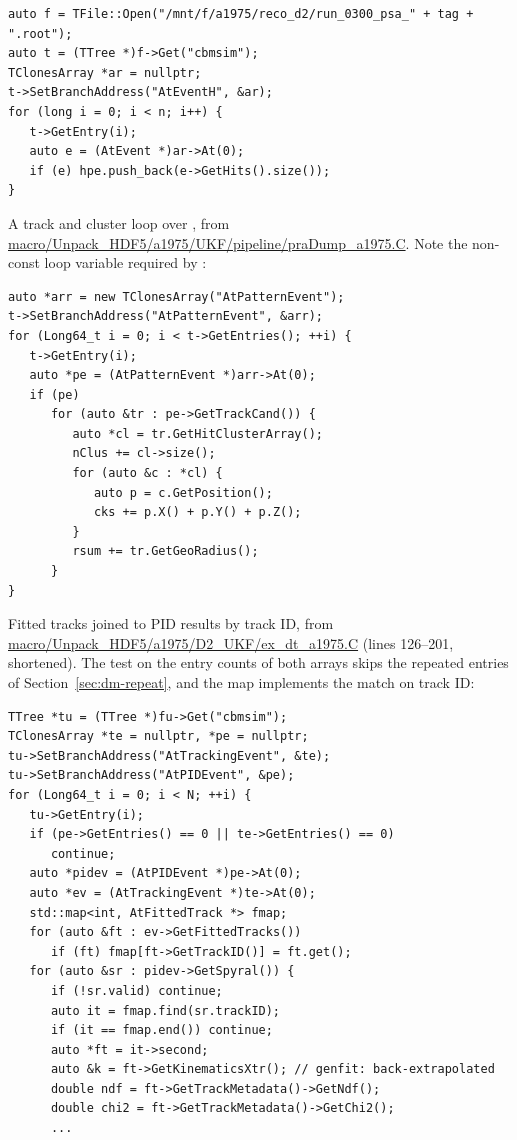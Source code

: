 \begin{verbatim}
auto f = TFile::Open("/mnt/f/a1975/reco_d2/run_0300_psa_" + tag + ".root");
auto t = (TTree *)f->Get("cbmsim");
TClonesArray *ar = nullptr;
t->SetBranchAddress("AtEventH", &ar);
for (long i = 0; i < n; i++) {
   t->GetEntry(i);
   auto e = (AtEvent *)ar->At(0);
   if (e) hpe.push_back(e->GetHits().size());
}
\end{verbatim}

A track and cluster loop over , from
\url{macro/Unpack_HDF5/a1975/UKF/pipeline/praDump_a1975.C}. Note the non-const loop variable required by
:

\begin{verbatim}
auto *arr = new TClonesArray("AtPatternEvent");
t->SetBranchAddress("AtPatternEvent", &arr);
for (Long64_t i = 0; i < t->GetEntries(); ++i) {
   t->GetEntry(i);
   auto *pe = (AtPatternEvent *)arr->At(0);
   if (pe)
      for (auto &tr : pe->GetTrackCand()) {
         auto *cl = tr.GetHitClusterArray();
         nClus += cl->size();
         for (auto &c : *cl) {
            auto p = c.GetPosition();
            cks += p.X() + p.Y() + p.Z();
         }
         rsum += tr.GetGeoRadius();
      }
}
\end{verbatim}

Fitted tracks joined to PID results by track ID, from
\url{macro/Unpack_HDF5/a1975/D2_UKF/ex_dt_a1975.C} (lines 126--201, shortened). The test on the
entry counts of both arrays skips the repeated entries of Section~\ref{sec:dm-repeat}, and the map
implements the match on track ID:

\begin{verbatim}
TTree *tu = (TTree *)fu->Get("cbmsim");
TClonesArray *te = nullptr, *pe = nullptr;
tu->SetBranchAddress("AtTrackingEvent", &te);
tu->SetBranchAddress("AtPIDEvent", &pe);
for (Long64_t i = 0; i < N; ++i) {
   tu->GetEntry(i);
   if (pe->GetEntries() == 0 || te->GetEntries() == 0)
      continue;
   auto *pidev = (AtPIDEvent *)pe->At(0);
   auto *ev = (AtTrackingEvent *)te->At(0);
   std::map<int, AtFittedTrack *> fmap;
   for (auto &ft : ev->GetFittedTracks())
      if (ft) fmap[ft->GetTrackID()] = ft.get();
   for (auto &sr : pidev->GetSpyral()) {
      if (!sr.valid) continue;
      auto it = fmap.find(sr.trackID);
      if (it == fmap.end()) continue;
      auto *ft = it->second;
      auto &k = ft->GetKinematicsXtr(); // genfit: back-extrapolated
      double ndf = ft->GetTrackMetadata()->GetNdf();
      double chi2 = ft->GetTrackMetadata()->GetChi2();
      ...
\end{verbatim}

